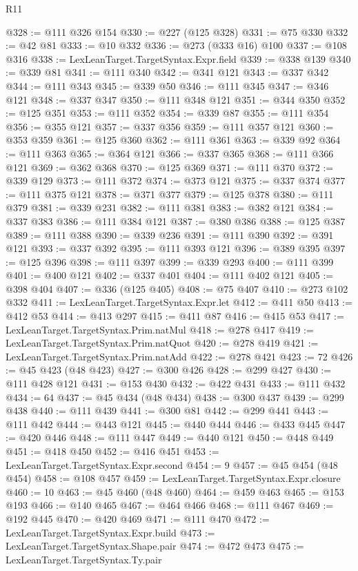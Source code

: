 \begin{lexlean}{R11}
\begin{coremodule}
@328 := @111 @326 @154
@330 := @227 (@125 @328)
@331 := @75 @330
@332 := @42 @81
@333 := @10 @332
@336 := @273 (@333 @16) @100
@337 := @108 @316
@338 := LexLeanTarget.TargetSyntax.Expr.field
@339 := @338 @139
@340 := @339 @81
@341 := @111 @340
@342 := @341 @121
@343 := @337 @342
@344 := @111 @343
@345 := @339 @50
@346 := @111 @345
@347 := @346 @121
@348 := @337 @347
@350 := @111 @348 @121
@351 := @344 @350
@352 := @125 @351
@353 := @111 @352
@354 := @339 @87
@355 := @111 @354
@356 := @355 @121
@357 := @337 @356
@359 := @111 @357 @121
@360 := @353 @359
@361 := @125 @360
@362 := @111 @361
@363 := @339 @92
@364 := @111 @363
@365 := @364 @121
@366 := @337 @365
@368 := @111 @366 @121
@369 := @362 @368
@370 := @125 @369
@371 := @111 @370
@372 := @339 @129
@373 := @111 @372
@374 := @373 @121
@375 := @337 @374
@377 := @111 @375 @121
@378 := @371 @377
@379 := @125 @378
@380 := @111 @379
@381 := @339 @231
@382 := @111 @381
@383 := @382 @121
@384 := @337 @383
@386 := @111 @384 @121
@387 := @380 @386
@388 := @125 @387
@389 := @111 @388
@390 := @339 @236
@391 := @111 @390
@392 := @391 @121
@393 := @337 @392
@395 := @111 @393 @121
@396 := @389 @395
@397 := @125 @396
@398 := @111 @397
@399 := @339 @293
@400 := @111 @399
@401 := @400 @121
@402 := @337 @401
@404 := @111 @402 @121
@405 := @398 @404
@407 := @336 (@125 @405)
@408 := @75 @407
@410 := @273 @102 @332
@411 := LexLeanTarget.TargetSyntax.Expr.let
@412 := @411 @50
@413 := @412 @53
@414 := @413 @297
@415 := @411 @87
@416 := @415 @53
@417 := LexLeanTarget.TargetSyntax.Prim.natMul
@418 := @278 @417
@419 := LexLeanTarget.TargetSyntax.Prim.natQuot
@420 := @278 @419
@421 := LexLeanTarget.TargetSyntax.Prim.natAdd
@422 := @278 @421
@423 := 72
@426 := @45 @423 (@48 @423)
@427 := @300 @426
@428 := @299 @427
@430 := @111 @428 @121
@431 := @153 @430
@432 := @422 @431
@433 := @111 @432
@434 := 64
@437 := @45 @434 (@48 @434)
@438 := @300 @437
@439 := @299 @438
@440 := @111 @439
@441 := @300 @81
@442 := @299 @441
@443 := @111 @442
@444 := @443 @121
@445 := @440 @444
@446 := @433 @445
@447 := @420 @446
@448 := @111 @447
@449 := @440 @121
@450 := @448 @449
@451 := @418 @450
@452 := @416 @451
@453 := LexLeanTarget.TargetSyntax.Expr.second
@454 := 9
@457 := @45 @454 (@48 @454)
@458 := @108 @457
@459 := LexLeanTarget.TargetSyntax.Expr.closure
@460 := 10
@463 := @45 @460 (@48 @460)
@464 := @459 @463
@465 := @153 @193
@466 := @140 @465
@467 := @464 @466
@468 := @111 @467
@469 := @192 @445
@470 := @420 @469
@471 := @111 @470
@472 := LexLeanTarget.TargetSyntax.Expr.build
@473 := LexLeanTarget.TargetSyntax.Shape.pair
@474 := @472 @473
@475 := LexLeanTarget.TargetSyntax.Ty.pair

\end{coremodule}
\end{lexlean}
